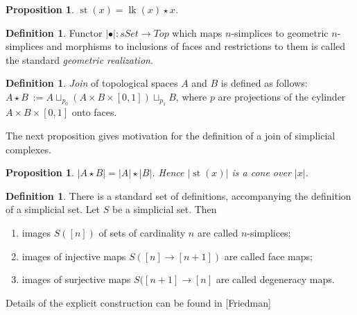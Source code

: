 \documentclass[english,12pt]{article}
\newcounter{stmcounter}[section]
\numberwithin{equation}{section}
\newtheorem{proposition}[stmcounter]{Proposition}
\theoremstyle{definition}
\newtheorem{definition}[stmcounter]{Definition}
\theoremstyle{remark}
\newcommand{\define}[1]{{\textit{#1}}}
\begin{document}
\begin{proposition}
  $\operatorname{st}(x) = \operatorname{lk}(x) \star x$.
\end{proposition}

\begin{definition}
  Functor $\left|\bullet\right| : sSet \to Top$ which maps $n$-simplices to geometric $n$-simplices and morphisms to inclusions of faces and restrictions to them is called the standard \define{geometric realization}.
\end{definition}

\begin{definition}
  \define{Join} of topological spaces $A$ and $B$ is defined as follows: $A \star B\ := A \sqcup_{p_0} (A \times B \times [0,1]) \sqcup_{p_1} B$, where $p$ are projections of the cylinder $A \times B \times [0,1]$ onto faces.
\end{definition}

The next proposition gives motivation for the definition of a join of simplicial complexes.

\begin{proposition}
  $\left|A \star B\right| = \left|A\right| \star \left|B\right|$. Hence $\left|\operatorname{st}(x)\right|$ is a cone over $\left|x\right|$.
\end{proposition}

\begin{definition}
  There is a standard set of definitions, accompanying the definition of a simplicial set. Let $S$ be a simplicial set. Then
  \begin{enumerate}
    \item images $S([n])$ of sets of cardinality $n$ are called $n$-simplices;
    \item images of injective maps $S([n] \to [n+1])$ are called face maps;
    \item images of surjective maps $S([n+1] \to [n]$ are called degeneracy maps.
  \end{enumerate}
  
  Details of the explicit construction can be found in [Friedman]
\end{definition}
\end{document}
